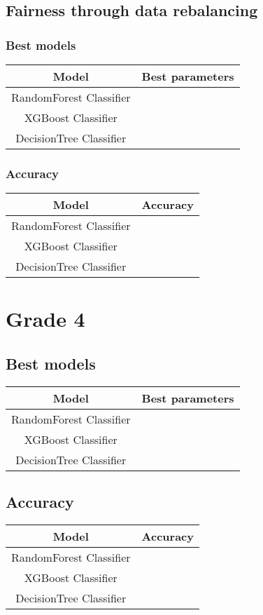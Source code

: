\documentclass[12pt,a4paper,openright,twoside]{book}
\begin{document}
\subsection{Fairness through data rebalancing}
\subsubsection{Best models}
\begin{tabular}{|c|c|}
    \hline
    \textbf{Model} & \textbf{Best parameters} \\
    \hline
    RandomForest Classifier  &  \\
    \hline
    XGBoost Classifier & \\
    \hline
    DecisionTree Classifier &  \\
    \hline
\end{tabular}

\subsubsection{Accuracy}
\begin{tabular}{|c|c|}
    \hline
    \textbf{Model} & \textbf{Accuracy} \\
    \hline
    RandomForest Classifier  &  \\
    \hline
    XGBoost Classifier & \\
    \hline
    DecisionTree Classifier &  \\
    \hline
\end{tabular}


\section{Grade 4}
\subsection{Best models}
\begin{tabular}{|c|c|}
    \hline
    \textbf{Model} & \textbf{Best parameters} \\
    \hline
    RandomForest Classifier  &  \\
    \hline
    XGBoost Classifier & \\
    \hline
    DecisionTree Classifier &  \\
    \hline
\end{tabular}

\subsection{Accuracy}
\begin{tabular}{|c|c|}
    \hline
    \textbf{Model} & \textbf{Accuracy} \\
    \hline
    RandomForest Classifier  &  \\
    \hline
    XGBoost Classifier & \\
    \hline
    DecisionTree Classifier &  \\
    \hline
\end{tabular}
\end{document}
